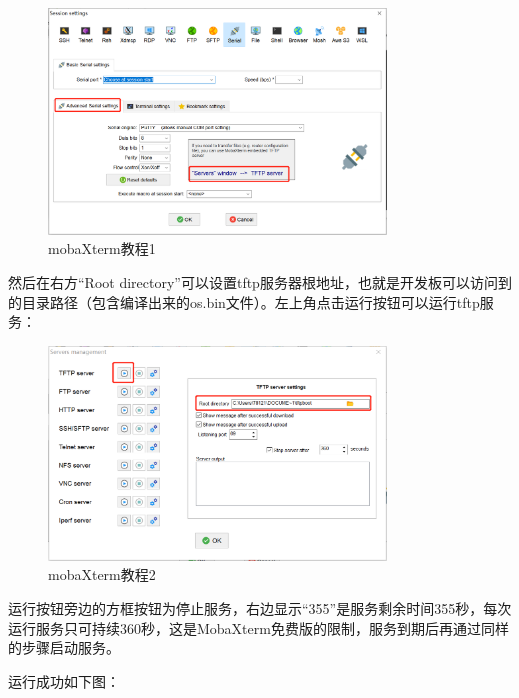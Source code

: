     \begin{figure}[h]
    	\centering
    	\includegraphics[width=0.8\textwidth]{figures/08-01-mobaXterm教程1.png}
    	\caption{mobaXterm教程1}
    	\label{mobaXterm教程1}
    \end{figure}
    
    然后在右方“Root directory”可以设置tftp服务器根地址，也就是开发板可以访问到的目录路径（包含编译出来的os.bin文件）。左上角点击运行按钮可以运行tftp服务：
    
    \begin{figure}[h]
    	\centering
    	\includegraphics[width=0.8\textwidth]{figures/08-01-mobaXterm教程2.png}
    	\caption{mobaXterm教程2}
    	\label{mobaXterm教程2}
    \end{figure}
    
    运行按钮旁边的方框按钮为停止服务，右边显示“355”是服务剩余时间355秒，每次运行服务只可持续360秒，这是MobaXterm免费版的限制，服务到期后再通过同样的步骤启动服务。
   
    运行成功如下图：
    
